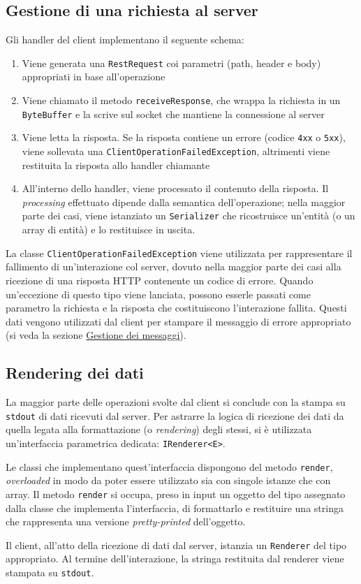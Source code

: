 \documentclass[a4paper,8pt]{article} %
\def\code#1{\texttt{#1}}
\begin{document}
\subsection{Gestione di una richiesta al server}
Gli handler del client implementano il seguente schema:
\begin{enumerate}
    \item Viene generata una \code{RestRequest} coi parametri (path, header e body) appropriati in base all'operazione
    \item Viene chiamato il metodo \code{receiveResponse}, che wrappa la richiesta in un \code{ByteBuffer} e la scrive sul socket che mantiene la connessione al server
    \item Viene letta la risposta. Se la risposta contiene un errore (codice \code{4xx} o \code{5xx}), viene sollevata una \code{ClientOperationFailedException}, altrimenti viene restituita la risposta allo handler chiamante
    \item All'interno dello handler, viene processato il contenuto della risposta. Il \emph{processing} effettuato dipende dalla semantica dell'operazione; nella maggior parte dei casi, viene istanziato un \code{Serializer} che ricostruisce un'entità (o un array di entità) e lo restituisce in uscita.
\end{enumerate}
La classe \code{ClientOperationFailedException} viene utilizzata per rappresentare il fallimento di un'interazione col server, dovuto nella maggior parte dei casi alla ricezione di una risposta HTTP contenente un codice di errore.
Quando un'eccezione di questo tipo viene lanciata, possono esserle passati come parametro la richiesta e la risposta che costituiscono l'interazione fallita. Questi dati vengono utilizzati dal client per stampare il messaggio di errore appropriato (si veda la sezione \hyperref[sec:err_handling]{Gestione dei messaggi}).

\subsection{Rendering dei dati}
La maggior parte delle operazioni svolte dal client si conclude con la stampa su \code{stdout} di dati ricevuti dal server. Per astrarre la logica di ricezione dei dati da quella
legata alla formattazione (o \emph{rendering}) degli stessi, si è utilizzata un'interfaccia parametrica dedicata: \code{IRenderer<E>}.

\par Le classi che implementano quest'interfaccia dispongono del metodo \code{render}, \emph{overloaded} in modo da poter essere utilizzato sia con singole istanze che con array. Il metodo
\code{render} si occupa, preso in input un oggetto del tipo assegnato dalla classe che implementa l'interfaccia, di formattarlo e restituire una stringa che rappresenta una versione \emph{pretty-printed} dell'oggetto.
\par Il client, all'atto della ricezione di dati dal server, istanzia un \code{Renderer} del tipo appropriato. Al termine dell'interazione, la stringa restituita dal renderer viene stampata su \code{stdout}.
\end{document}
